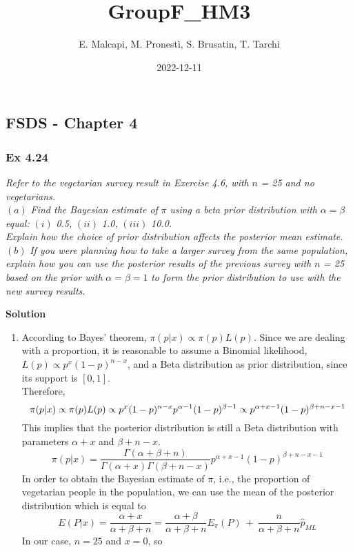 \documentclass[
]{article}
\title{GroupF\_HM3}
\author{E. Malcapi, M. Pronestì, S. Brusatin, T. Tarchi}
\date{2022-12-11}
\providecommand{\tightlist}{%
  \setlength{\itemsep}{0pt}\setlength{\parskip}{0pt}}
\begin{document}
\maketitle

{
\setcounter{tocdepth}{3}
\tableofcontents
}
\hypertarget{fsds---chapter-4}{%
\subsection{FSDS - Chapter 4}\label{fsds---chapter-4}}

\hypertarget{ex-4.24}{%
\subsubsection{Ex 4.24}\label{ex-4.24}}

\emph{Refer to the vegetarian survey result in Exercise 4.6, with }
\(n\) \emph{= 25 and no vegetarians.}\\
\((a)\) \emph{Find the Bayesian estimate of} \(\pi\) \emph{using a beta
prior distribution with} \(\alpha = \beta\) \emph{equal:} \((i)\)
\emph{0.5,} \((ii)\) \emph{1.0,} \((iii)\) \emph{10.0.}\\
\emph{Explain how the choice of prior distribution affects the posterior
mean estimate.}\\
\((b)\) \emph{If you were planning how to take a larger survey from the
same population, explain how you can use the posterior results of the
previous survey with} \(n\) \emph{= 25 based on the prior with}
\(\alpha = \beta = 1\) \emph{to form the prior distribution to use with
the new survey results.}

\textbf{Solution}

\begin{enumerate}
\def\labelenumi{(\alph{enumi})}
\tightlist
\item
  According to Bayes' theorem, \(\pi(p |x) \propto \pi(p)L(p)\). Since
  we are dealing with a proportion, it is reasonable to assume a
  Binomial likelihood, \(L(p) \propto p^x(1-p)^{n-x}\), and a Beta
  distribution as prior distribution, since its support is \([0,1]\).\\
  Therefore, \[
  \pi(p |x) \propto \pi(p)L(p) \propto p^x(1-p)^{n-x}p^{\alpha -1}(1-p)^{\beta -1} \\
  \propto p^{\alpha + x -1 }(1-p)^{\beta + n -x -1}           
  \] This implies that the posterior distribution is still a Beta
  distribution with parameters \(\alpha + x\) and \(\beta +n-x\). \[
  \pi(p|x)= \frac{\Gamma(\alpha + \beta +n)}{\Gamma(\alpha+x)\Gamma(\beta+n-x)}p^{\alpha + x - 1}(1-p)^{\beta +n -x-1}
  \] In order to obtain the Bayesian estimate of \(\pi\), i.e., the
  proportion of vegetarian people in the population, we can use the mean
  of the posterior distribution which is equal to \[
  E(P|x)=\frac{\alpha + x}{\alpha + \beta + n}= \frac{\alpha + \beta}{\alpha + \beta + n}E_{\pi}(P) \ + \ \frac{n}{\alpha + \beta + n} \hat{p}_{ML}
  \] In our case, \(n=25\) and \(x=0\), so
\end{enumerate}
\end{document}
